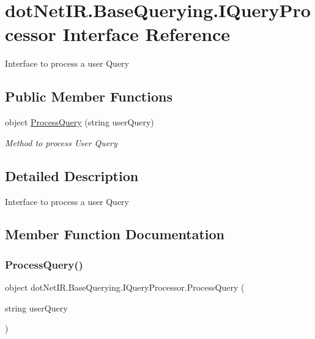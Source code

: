 \hypertarget{interfacedot_net_i_r_1_1_base_querying_1_1_i_query_processor}{}\section{dot\+Net\+I\+R.\+Base\+Querying.\+I\+Query\+Processor Interface Reference}
\label{interfacedot_net_i_r_1_1_base_querying_1_1_i_query_processor}


Interface to process a user Query  


\subsection*{Public Member Functions}
\begin{DoxyCompactItemize}
\item 
object \hyperlink{interfacedot_net_i_r_1_1_base_querying_1_1_i_query_processor_a067c3e6b45bacde3fd096f7f088b4409}{Process\+Query} (string user\+Query)
\begin{DoxyCompactList}\small\item\em Method to process User Query \end{DoxyCompactList}\end{DoxyCompactItemize}


\subsection{Detailed Description}
Interface to process a user Query 



\subsection{Member Function Documentation}
\hypertarget{interfacedot_net_i_r_1_1_base_querying_1_1_i_query_processor_a067c3e6b45bacde3fd096f7f088b4409}{}\label{interfacedot_net_i_r_1_1_base_querying_1_1_i_query_processor_a067c3e6b45bacde3fd096f7f088b4409} 
\subsubsection{\texorpdfstring{Process\+Query()}{ProcessQuery()}}
{\footnotesize\ttfamily object dot\+Net\+I\+R.\+Base\+Querying.\+I\+Query\+Processor.\+Process\+Query (\begin{DoxyParamCaption}\item[{string}]{user\+Query }\end{DoxyParamCaption})}



